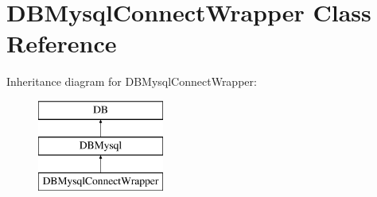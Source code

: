 \hypertarget{classDBMysqlConnectWrapper}{\section{D\+B\+Mysql\+Connect\+Wrapper Class Reference}
\label{classDBMysqlConnectWrapper}
}


 


Inheritance diagram for D\+B\+Mysql\+Connect\+Wrapper\+:\begin{figure}[H]
\begin{center}
\leavevmode
\includegraphics[height=3.000000cm]{classDBMysqlConnectWrapper}
\end{center}
\end{figure}
